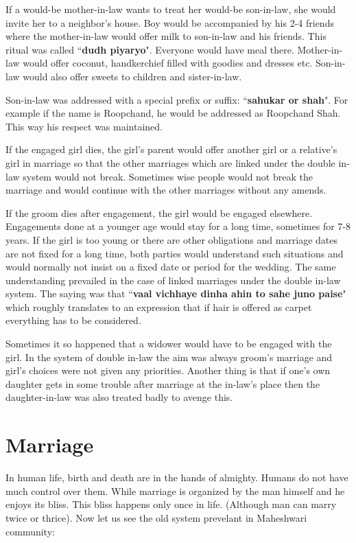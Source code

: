If a would-be mother-in-law wants to treat her would-be son-in-law, she would
invite her to a neighbor's house. Boy would be accompanied by his 2-4 friends
where the mother-in-law would offer milk to son-in-law and his friends. This
ritual was called ``\textbf{dudh piyaryo}". Everyone would have meal there.
Mother-in-law would offer coconut, handkerchief filled with goodies and dresses
etc. Son-in-law would also offer sweets to children and sister-in-law. 

Son-in-law was addressed with a special prefix or suffix: ``\textbf{sahukar or
shah}". For example if the name is Roopchand, he would be addressed as
Roopchand Shah. This way his respect was maintained.

If the engaged girl dies, the girl's parent would offer another girl or a
relative's girl in marriage so that the other marriages which are linked under
the double in-law system would not break. Sometimes wise people would not break
the marriage and would continue with the other marriages without any amends.

If the groom dies after engagement, the girl would be engaged elsewhere.
Engagements done at a younger age would stay for a long  time, sometimes for
7-8 years. If the girl is too young or there are other obligations and marriage
dates are not fixed for a long time, both parties would understand such
situations and would normally not insist on a fixed date or period for the
wedding. The same understanding prevailed in the case of linked marriages under
the double in-law system. The saying was that ``\textbf{vaal vichhaye dinha
ahin to sahe juno paise}" which roughly translates to an expression that if
hair is offered as carpet everything has to be considered.

Sometimes it so happened that a widower would have to be engaged with  the
girl. In the system of double in-law the aim was always groom's marriage and
girl's choices were not given any priorities. Another thing is that if one's
own daughter gets in some trouble after marriage at the in-law's place then the
daughter-in-law was also treated badly to avenge this.

\section{Marriage}
In human life, birth and death are in the hands of almighty. Humans do not have
much control over them. While marriage is organized by the man himself and he
enjoys its bliss. This bliss happens only once in life. (Although man can marry
twice or thrice). Now let us see the old system prevelant in Maheshwari
community:

